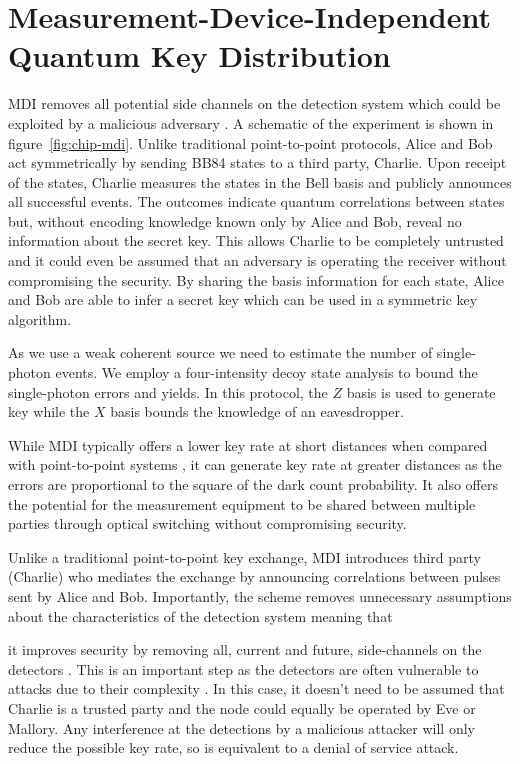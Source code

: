 \section{Measurement-Device-Independent Quantum Key Distribution}
\label{sec:mdi-qkd}

\Ac{MDI} removes all potential side channels on the detection system which could be exploited by a malicious adversary \cite{mdi-qkd}. A schematic of the experiment is shown in figure~\ref{fig:chip-mdi}. Unlike traditional point-to-point protocols, Alice and Bob act symmetrically by sending BB84 states to a third party, Charlie. Upon receipt of the states, Charlie measures the states in the Bell basis and publicly announces all successful events. The outcomes indicate quantum correlations between states but, without encoding knowledge known only by Alice and Bob, reveal no information about the secret key. This allows Charlie to be completely untrusted and it could even be assumed that an adversary is operating the receiver without compromising the security. By sharing the basis information for each state, Alice and Bob are able to infer a secret key which can be used in a symmetric key algorithm. 

As we use a weak coherent source we need to estimate the number of single-photon events. We employ a four-intensity decoy state analysis \cite{zhou2016} to bound the single-photon errors and yields. In this protocol, the $Z$ basis is used to generate key while the $X$ basis bounds the knowledge of an eavesdropper. 

While \ac{MDI} typically offers a lower key rate at short distances when compared with point-to-point systems \cite{Sibson2017InP}, it can generate key rate at greater distances \cite{yin2016} as the errors are proportional to the square of the dark count probability. It also offers the potential for the measurement equipment to be shared between multiple parties through optical switching without compromising security.

Unlike a traditional point-to-point key exchange, \ac{MDI} introduces third party (Charlie) who mediates the exchange by announcing correlations between pulses sent by Alice and Bob. Importantly, the scheme removes unnecessary assumptions about the characteristics of the detection system meaning that 

it improves security by removing all, current and future, side-channels on the detectors \cite{mdi-qkd}. This is an important step as the detectors are often vulnerable to attacks due to their complexity \cite{Lydersen2010a, Makarov2006}. In this case, it doesn't need to be assumed that Charlie is a trusted party and the node could equally be operated by Eve or Mallory. Any interference at the detections by a malicious attacker will only reduce the possible key rate, so is equivalent to a denial of service attack.

